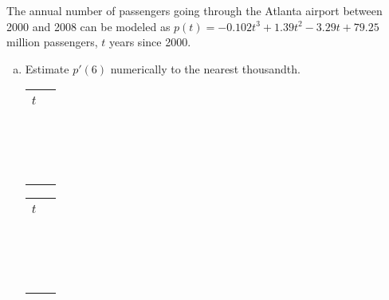 \documentclass[notes]{subfiles}
\begin{document}
		\begin{ex} The annual number of passengers going through the Atlanta airport between 2000 and 2008 can be modeled as $p(t) = -0.102t^3 + 1.39t^2 -3.29t + 79.25$ million passengers, $t$ years since 2000.
			\begin{enumerate}[(a)]
				\item Estimate $p'(6)$ numerically to the nearest thousandth.
					\begin{center}
				\begin{minipage}{.45\textwidth}
					\tabulinesep=1mm					
					\begin{tabu}{|X[c]|X[1.5,c]|}\hline
								& \\
						$t$ 		& \\ 
								& \\ \hline
								& \\
								& \\ 
								& \\ \hline
								& \\
								& \\
								& \\ \hline 
								& \\
								& \\ 
								& \\ \hline
								& \\ 
								& \\ 
								& \\ \hline
								& \\
								& \\
								& \\ \hline
					\end{tabu}
				\end{minipage}
				\begin{minipage}{.45\textwidth}
					\tabulinesep=1mm
					\begin{tabu}{|X[c]|X[1.5,c]|}\hline
								& \\
						$t$ 		& \\ 
								& \\ \hline
								& \\
								& \\ 
								& \\ \hline
								& \\
								& \\
								& \\ \hline 
								& \\
								& \\ 
								& \\ \hline
								& \\ 
								& \\ 
								& \\ \hline
								& \\
								& \\
								& \\ \hline
					\end{tabu}
				\end{minipage}
			\end{center}	
					\newpage


\end{enumerate}
\end{ex}
\end{document}
